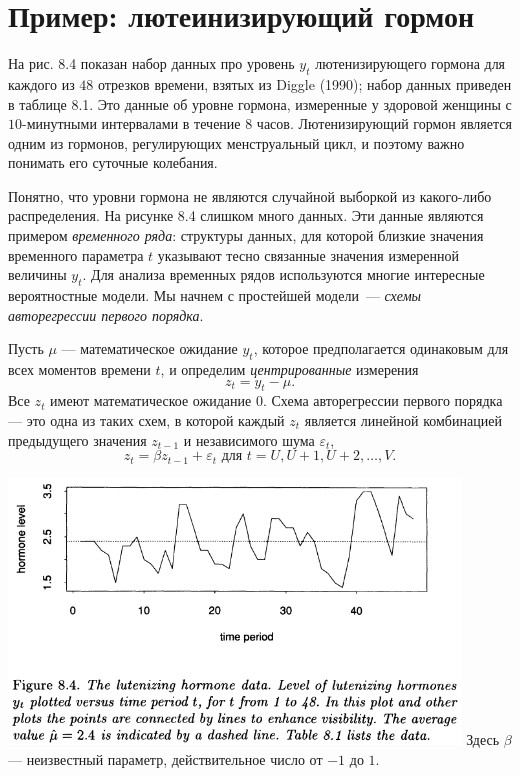\section{Пример: лютеинизирующий гормон}

На рис. 8.4 показан набор данных про уровень $y_t$ лютенизирующего гормона для каждого из $48$ отрезков времени, взятых из Diggle (1990); набор данных приведен в таблице 8.1. Это данные об уровне гормона, измеренные у здоровой женщины с $10$-минутными интервалами в течение $8$ часов. Лютенизирующий гормон является одним из гормонов, регулирующих менструальный цикл, и поэтому важно понимать его суточные колебания. 

Понятно, что уровни гормона не являются случайной выборкой из какого-либо распределения. На рисунке 8.4 слишком много данных. Эти данные являются примером \textit{временного ряда}: структуры данных, для которой близкие значения временного параметра $t$ указывают тесно связанные значения измеренной величины $y_t$. Для анализа временных рядов используются многие интересные вероятностные модели. Мы начнем с простейшей модели~--- \textit{схемы авторегрессии первого порядка}.

Пусть $\mu$ --- математическое ожидание $y_t$, которое предполагается одинаковым для всех моментов времени $t$, и определим \textit{центрированные} измерения
\begin{equation}
	z_t = y_t - \mu.
\end{equation}
Все $z_t$ имеют математическое ожидание $0$. Схема авторегрессии первого порядка --- это одна из таких схем, в которой каждый $z_t$ является линейной комбинацией предыдущего значения $z_{t-1}$ и независимого шума $\varepsilon_t$,
\begin{equation}
	z_t = \beta z_{t-1} + \varepsilon_t \text{ для } t = U, U + 1, U + 2, \ldots, V.
\end{equation}

\noindent
\includegraphics[width=12cm]{8/f84}
\newline
\noindent Здесь $\beta$ --- неизвестный параметр, действительное число от $-1$ до $1$. 

